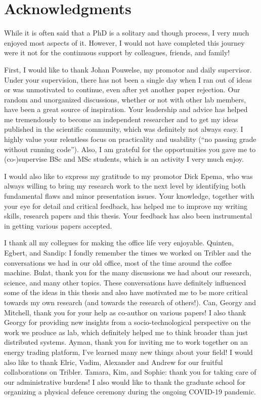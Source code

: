 \chapter*{Acknowledgments}

While it is often said that a PhD is a solitary and though process, I very much enjoyed most aspects of it.
However, I would not have completed this journey were it not for the continuous support by colleagues, friends, and family!

First, I would like to thank Johan Pouwelse, my promotor and daily supervisor.
Under your supervision, there has not been a single day when I ran out of ideas or was unmotivated to continue, even after yet another paper rejection.
Our random and unorganized discussions, whether or not with other lab members, have been a great source of inspiration.
Your leadership and advice has helped me tremendously to become an independent researcher and to get my ideas published in the scientific community, which was definitely not always easy.
I highly value your relentless focus on practicality and usability (\enquote{no passing grade without running code}).
Also, I am grateful for the opportunities you gave me to (co-)supervise BSc and MSc students, which is an activity I very much enjoy.

I would also like to express my gratitude to my promotor Dick Epema, who was always willing to bring my research work to the next level by identifying both fundamental flaws and minor presentation issues.
Your knowledge, together with your eye for detail and critical feedback, has helped me to improve my writing skills, research papers and this thesis.
Your feedback has also been instrumental in getting various papers accepted.

I thank all my collegues for making the office life very enjoyable.
Quinten, Egbert, and Sandip: I fondly remember the times we worked on Tribler and the conversations we had in our old office, most of the time around the coffee machine.
Bulat, thank you for the many discussions we had about our research, science, and many other topics.
These conversations have definitely influenced some of the ideas in this thesis and also have motivated me to be more critical towards my own research (and towards the research of others!).
Can, Georgy and Mitchell, thank you for your help as co-author on various papers!
I also thank Georgy for providing new insights from a socio-technological perspective on the work we produce as lab, which definitely helped me to think broader than just distributed systems.
Ayman, thank you for inviting me to work together on an energy trading platform, I've learned many new things about your field!
I would also like to thank Elric, Vadim, Alexander and Andrew for our fruitful collaborations on Tribler.
Tamara, Kim, and Sophie: thank you for taking care of our administrative burdens!
I also would like to thank the graduate school for organizing a physical defence ceremony during the ongoing COVID-19 pandemic.

